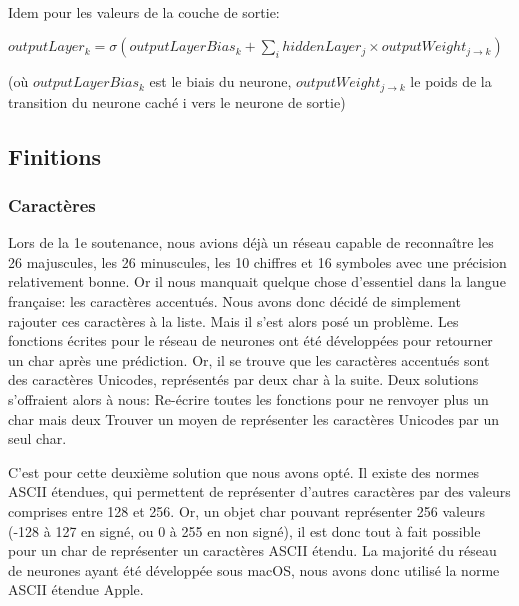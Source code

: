 \documentclass{article}
\begin{document}
\vspace*{0.3cm}

\paragraph{} Idem pour les valeurs de la couche de sortie:\newline

$outputLayer_k=\sigma(outputLayerBias_k+\sum_i hiddenLayer_j\times outputWeight_{j\rightarrow k})$


(où $outputLayerBias_k$ est le biais du neurone, $outputWeight_{j\rightarrow k}$ le poids de la transition du neurone caché i vers le neurone de sortie)

\subsection{Finitions}

\subsubsection{Caractères}

Lors de la 1e soutenance, nous avions déjà un réseau capable de reconnaître les 26 majuscules, les 26 minuscules, les 10 chiffres et 16 symboles avec une précision relativement bonne. Or il nous manquait quelque chose d’essentiel dans la langue française: les caractères accentués.
Nous avons donc décidé de simplement rajouter ces caractères à la liste. Mais il s’est alors posé un problème. Les fonctions écrites pour le réseau de neurones ont été développées pour retourner un char après une prédiction. Or, il se trouve que les caractères accentués sont des caractères Unicodes, représentés par deux char à la suite.
Deux solutions s’offraient alors à nous:
Re-écrire toutes les fonctions pour ne renvoyer plus un char mais deux
Trouver un moyen de représenter les caractères Unicodes par un seul char.

C’est pour cette deuxième solution que nous avons opté.
Il existe des normes ASCII étendues, qui permettent de représenter d’autres caractères par des valeurs comprises entre 128 et 256. Or, un objet char pouvant représenter 256 valeurs (-128 à 127 en signé, ou 0 à 255 en non signé), il est donc tout à fait possible pour un char de représenter un caractères ASCII étendu.
La majorité du réseau de neurones ayant été développée sous macOS, nous avons donc utilisé la norme ASCII étendue Apple.
\end{document}
